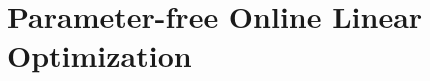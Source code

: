 \documentclass[../main]{subfiles}
\begin{document}
\setcounter{chapter}{8}

\chapter{Parameter-free Online Linear Optimization}


\end{document}
